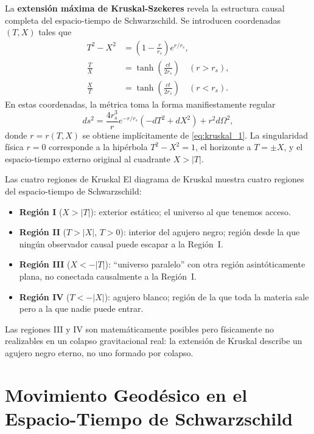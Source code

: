 La \textbf{extensión máxima de Kruskal-Szekeres} revela la estructura causal completa del espacio-tiempo de Schwarzschild. Se introducen coordenadas $(T, X)$ tales que
\begin{align}
  T^2 - X^2 &= \left(1 - \frac{r}{r_s}\right)e^{r/r_s},
  \label{eq:kruskal_1}\\
  \frac{T}{X} &= \tanh\!\left(\frac{ct}{2r_s}\right) \quad (r > r_s), \nonumber\\
  \frac{X}{T} &= \tanh\!\left(\frac{ct}{2r_s}\right) \quad (r < r_s). \nonumber
\end{align}
En estas coordenadas, la métrica toma la forma manifiestamente regular
\begin{equation}
  ds^2 = \frac{4r_s^3}{r}e^{-r/r_s}\!\left(-dT^2 + dX^2\right) + r^2 d\Omega^2,
  \label{eq:metrica_kruskal}
\end{equation}
donde $r = r(T,X)$ se obtiene implícitamente de \eqref{eq:kruskal_1}. La singularidad física $r=0$ corresponde a la hipérbola $T^2 - X^2 = 1$, el horizonte a $T = \pm X$, y el espacio-tiempo externo original al cuadrante $X > |T|$.

\begin{observacion}{Las cuatro regiones de Kruskal}{}
El diagrama de Kruskal muestra cuatro regiones del espacio-tiempo de Schwarzschild:
\begin{itemize}[leftmargin=2em]
  \item \textbf{Región I} ($X > |T|$): exterior estático; el universo al que tenemos acceso.
  \item \textbf{Región II} ($T > |X|$, $T > 0$): interior del agujero negro; región desde la que ningún observador causal puede escapar a la Región~I.
  \item \textbf{Región III} ($X < -|T|$): ``universo paralelo'' con otra región asintóticamente plana, no conectada causalmente a la Región~I.
  \item \textbf{Región IV} ($T < -|X|$): agujero blanco; región de la que toda la materia sale pero a la que nadie puede entrar.
\end{itemize}
Las regiones III y IV son matemáticamente posibles pero físicamente no realizables en un colapso gravitacional real: la extensión de Kruskal describe un agujero negro eterno, no uno formado por colapso.
\end{observacion}

\section{Movimiento Geodésico en el Espacio-Tiempo de Schwarzschild}
\label{sec:geodesicas_schwarz}


